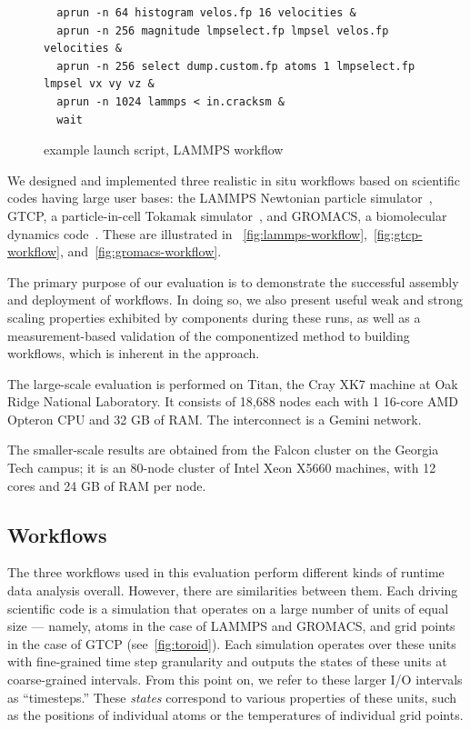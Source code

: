 \begin{figure}
  \begin{lstlisting}
  aprun -n 64 histogram velos.fp 16 velocities &
  aprun -n 256 magnitude lmpselect.fp lmpsel velos.fp velocities &
  aprun -n 256 select dump.custom.fp atoms 1 lmpselect.fp lmpsel vx vy vz &
  aprun -n 1024 lammps < in.cracksm &
  wait
  \end{lstlisting}
  \vspace{-0.07in}
  \caption{\sys example launch script, LAMMPS workflow}
  \label{fig:launch-script}
\end{figure}

We designed and implemented three realistic in situ workflows based on
scientific codes having large user bases: the LAMMPS Newtonian particle
simulator~\cite{plimpton:1997:lammps}, GTCP, a particle-in-cell Tokamak
simulator~\cite{lin:gtc}, and GROMACS,
a biomolecular dynamics code~\cite{hess2008gromacs}.
These are illustrated in
~\autoref{fig:lammps-workflow},~\autoref{fig:gtcp-workflow},
and~\autoref{fig:gromacs-workflow}.

The primary purpose of our evaluation is to demonstrate the
successful assembly and deployment of \sys workflows. In doing so, 
we also present useful
weak and strong scaling properties exhibited by \sys components
during these runs, as well as a measurement-based validation of
the componentized method to building workflows, which is inherent in the \sys approach.

The large-scale evaluation is performed on Titan, the Cray XK7 machine at Oak Ridge
National Laboratory. It consists of 18,688 nodes each with 1 16-core AMD
Opteron CPU and 32 GB of RAM. The interconnect is a Gemini network.

The smaller-scale results are obtained from the Falcon cluster
on the Georgia Tech campus; it is an 80-node cluster of Intel
Xeon X5660 machines, with 12 cores and 24 GB of RAM per node. 

\subsection{Workflows}

The three \sys workflows used in this evaluation perform
different kinds of runtime data analysis overall.
However, there are similarities between them.
Each driving scientific code is a simulation that
operates on a large number of units of equal size --- namely, atoms
in the case of LAMMPS and GROMACS, and grid points
in the case of GTCP (see~\autoref{fig:toroid}).
Each simulation operates over these units
with fine-grained time step granularity
and outputs the states of these units at coarse-grained
intervals. From this point on, we refer to these larger
I/O intervals as ``timesteps.''
These \textit{states} correspond to various properties
of these units, such as the positions of individual atoms or the
temperatures of individual grid points.

